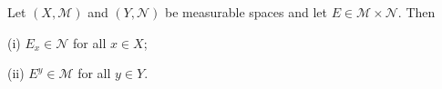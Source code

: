Let $(X, \mathcal{M})$ and $(Y, \mathcal{N})$ be measurable spaces and let $E \in \mathcal{M} \times \mathcal{N}$. Then

(i) $E_x \in \mathcal{N}$ for all $x \in X$;

(ii) $E^y \in \mathcal{M}$ for all $y \in Y$.

